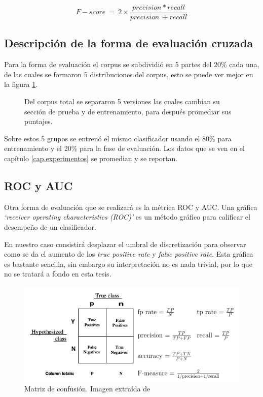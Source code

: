 \begin{figure}[H]
	\centering
	\begin{equation*}
		F-score\ =\ 2 \times  \frac{precision*recall}{precision\ +recall}
	\end{equation*}
\end{figure}

\subsection{Descripción de la forma de evaluación cruzada}

\par Para la forma de evaluación el corpus se subdividió en 5 partes del 20\% cada una, de las cuales se formaron 5 distribuciones del corpus, esto se puede ver mejor en la figura \ref{fig:corpusDiv}.

\begin{figure}
	\centering
	
	\caption{Del corpus total se separaron 5 versiones las cuales cambian su sección de prueba y de entrenamiento, para después promediar sus puntajes.}
	\label{fig:corpusDiv}
\end{figure}

\par Sobre estos 5 grupos se entrenó el mismo clasificador usando el 80\% para entrenamiento y el 20\% para la fase de evaluación. Los datos que se ven en el capítulo \ref{cap.experimentos} se promedian y se reportan.

\subsection{ROC y AUC}

\par Otra forma de evaluación que se realizará es la métrica ROC y AUC. Una gráfica \textit{`receiver operating characteristics (ROC)'} es un método gráfico para calificar el desempeño de un clasificador.
\par En nuestro caso consistirá desplazar el umbral de discretización para observar como se da el aumento de los \textit{true positive rate} y \textit{false positive rate}. Esta gráfica es bastante sencilla, sin embargo su interpretación no es nada trivial, por lo que no se tratará a fondo en esta tesis.

\begin{figure}
	\centering
	\includegraphics[width=\linewidth]{imagenes/confusionMatrix.png}
	\caption{Matriz de confusión. Imagen extraída de \cite{fawcett2006introduction}}
	\label{fig:confMat}
\end{figure}

